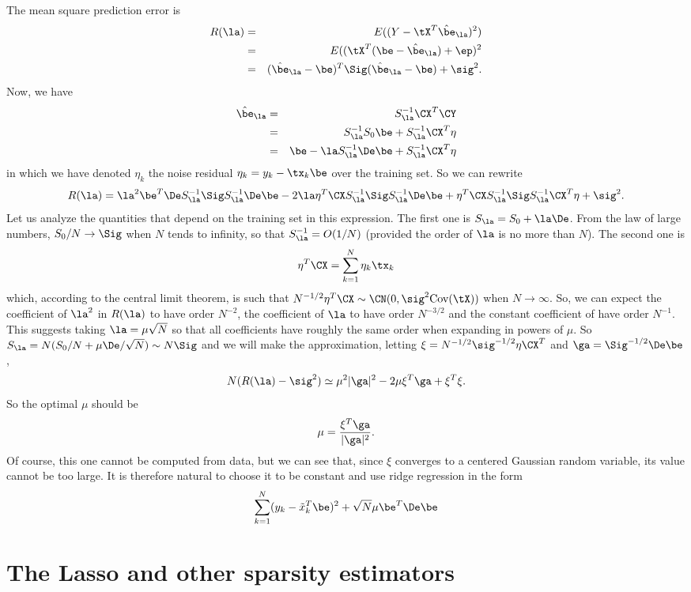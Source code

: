 The mean square prediction error is 
\begin{eqnarray*}
R(\la) &=& E((Y - \tX^T \hat\be_\la)^2)\\
& =& E((\tX^T(\be - \hat\be_\la) + \ep)^2\\
&=& (\hat\be_\la- \be)^T \Sig (\hat\be_\la - \be) + \sig^2.
\end{eqnarray*}
Now, we have
\begin{eqnarray*}
\hat\be_\la &=& S_\la^{-1}\CX^T\CY \\
&=& S_\la^{-1}S_0 \be + S_\la^{-1}\CX^T\eta\\
&=& \be - \la S_\la^{-1}\De \be + S_\la^{-1}\CX^T\eta
\end{eqnarray*}
in which we have denoted $\eta_k$ the noise residual $\eta_k = y_k -
\tx_k \be$ over the training set.
So we can rewrite
$$
R(\la) = \la^2 \be^T \De S_\la^{-1} \Sig S_\la^{-1} \De \be -2\la \eta^T\CX
S_\la^{-1} \Sig S_\la^{-1}\De \be + \eta^T\CX S_\la^{-1} \Sig
S_\la^{-1} \CX^T\eta + \sig^2.
$$
Let us analyze the quantities that depend on the training set in this
expression. The first one is $S_\la = S_0 + \la \De$. From the law of
large numbers, $S_0/N \to \Sig$ when $N$ tends to infinity, so that
$S_\la^{-1} = O(1/N)$ (provided the order of $\la$ is no more than
$N$). The second one is 
$$
\eta^T\CX = \sum_{k=1}^N \eta_k \tx_k
$$
which, according to the central limit theorem, is such that
$N^{-1/2}\eta^T\CX \sim \CN(0, \sig^2 \text{Cov}(\tX))$ when
$N\to\infty$. So, we can expect the coefficient of $\la^2$  in
$R(\la)$ to have order $N^{-2}$, the coefficient of $\la$ to have
order $N^{-3/2}$ and the constant coefficient of have order
$N^{-1}$. This suggests taking $\la = \mu \sqrt{N}$ so that all
coefficients have roughly the same order when expanding in powers of
$\mu$. So $S_\la = N(S_0/N + \mu\De/\sqrt N) \sim N\Sig$ and we will
make the approximation, letting $\xi = N^{-1/2} \sig^{-1/2}\eta \CX^T$
and $\ga = \Sig^{-1/2} \De\be$,
$$
N(R(\la) - \sig^2) \simeq \mu^2  |\ga|^2 - 2 \mu \xi^T
\ga  + \xi^T \xi.
$$
So the optimal $\mu$ should be 
$$
\mu = \frac{\xi^T\ga}{|\ga|^2}.
$$
Of course, this one cannot be computed from  data, but we can see
that, since $\xi$ converges to a centered Gaussian random variable,
its value cannot be too large. It is therefore natural to choose it to
be constant and use ridge regression in the form
$$
\sum_{k=1}^N (y_k - \tilde x_k^T \be)^2 + \sqrt N\mu \be^T \De \be
$$ 

\section{The Lasso and other sparsity estimators}

